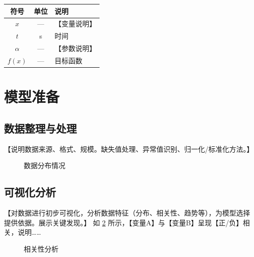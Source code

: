 \documentclass[withoutpreface,bwprint]{cumcmthesis}
\begin{document}
{\renewcommand{\arraystretch}{1.38}
\setlength{\tabcolsep}{6pt}
\begin{longtable}{ccl}
    \toprule[1.5pt]
    符号       & 单位 & 说明     \\
    \midrule[1pt]
    \endfirsthead
    \endhead
    \bottomrule[1.5pt]
    \endlastfoot
    $x$      & —  & 【变量说明】 \\
    $t$      & s  & 时间     \\
    $\alpha$ & —  & 【参数说明】 \\
    $f(x)$   & —  & 目标函数   \\
\end{longtable}}

\section{模型准备}

\subsection{数据整理与处理}

【说明数据来源、格式、规模。缺失值处理、异常值识别、归一化/标准化方法。】

\begin{figure}[H]
    \centering
    \caption{数据分布情况}
    \label{fig:data_dist}
\end{figure}

\subsection{可视化分析}

【对数据进行初步可视化，分析数据特征（分布、相关性、趋势等），为模型选择提供依据。展示关键发现。】
如 \cref{fig:correlation} 所示，【变量A】与【变量B】呈现【正/负】相关，说明……

\begin{figure}[H]
    \centering
    \caption{相关性分析}
    \label{fig:correlation}
\end{figure}
\end{document}
